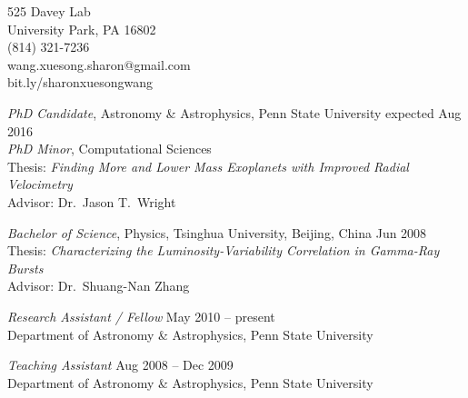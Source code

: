 

\begin{small}

\begin{center}
525 Davey Lab\\
University Park, PA 16802\\
(814) 321-7236\\
wang.xuesong.sharon@gmail.com\\
bit.ly/sharonxuesongwang\\


\end{center}
\smallskip




{\sl PhD Candidate}, Astronomy \& Astrophysics, Penn State University
\hfill expected Aug 2016 \\
{\sl PhD Minor}, Computational Sciences\\
Thesis: \textit{Finding More and Lower Mass Exoplanets with Improved
  Radial Velocimetry}\\ 
Advisor: Dr.\ Jason T.\ Wright
\vspace{10pt}

{\sl Bachelor of Science}, Physics, Tsinghua University, Beijing,
China \hfill Jun 2008 \\
Thesis: \textit{Characterizing the Luminosity-Variability Correlation
  in Gamma-Ray Bursts}\\
Advisor: Dr.\ Shuang-Nan Zhang






{\sl Research Assistant / Fellow} \hfill        May 2010 -- present  \\
Department of Astronomy \& Astrophysics, Penn State University

\vspace{10pt}   
   
{\sl Teaching Assistant} \hfill       Aug 2008 -- Dec 2009 \\
Department of Astronomy \& Astrophysics, Penn State University
   



\end{small}
